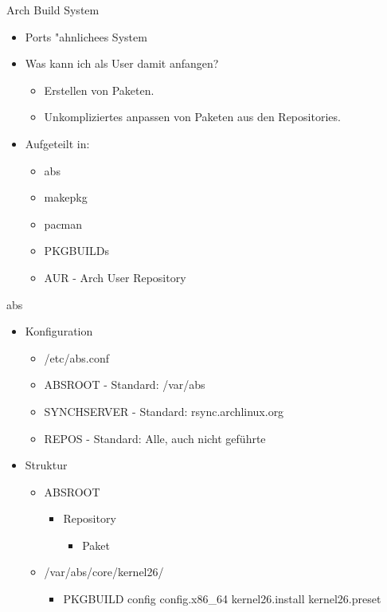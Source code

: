 
\begin{slide}{Arch Build System}
	\begin{itemize}
		\item{Ports "{a}hnlichees System}
		\item{Was kann ich als User damit anfangen?
			\begin{itemize}
				\item{Erstellen von Paketen.}
				\item{Unkompliziertes anpassen von Paketen aus den 
					Repositories.}
			\end{itemize}
		}
		\item{Aufgeteilt in:
			\begin{itemize}
				\item{abs}
				\item{makepkg}
				\item{pacman}
				\item{PKGBUILDs}
				\item{AUR - Arch User Repository}
			\end{itemize}
		}
	\end{itemize}
\end{slide}

\begin{slide}{abs}
	\begin{itemize}
		\item{Konfiguration
			\begin{itemize}
				\item{/etc/abs.conf}
				\item{ABSROOT -  Standard: /var/abs}
				\item{SYNCHSERVER - Standard: rsync.archlinux.org}
				\item{REPOS - Standard: Alle, auch nicht geführte}
			\end{itemize}
		}
		\item{Struktur
			\begin{itemize}
				\item{ABSROOT
					\begin{itemize}
						\item{Repository
							\begin{itemize}
								\item{Paket}
							\end{itemize}
						}
					\end{itemize}
				}
				\item{/var/abs/core/kernel26/
					\begin{itemize}
						\item{PKGBUILD config config.x86\_64 kernel26.install
							kernel26.preset}
					\end{itemize}
				}
			\end{itemize}
		}
	\end{itemize}
\end{slide}

